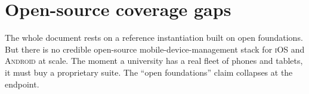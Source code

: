 \documentclass[11pt,a4paper,twoside]{book}
\newcommand{\institution}[1]{\textsc{#1}}
\begin{document}
\section{Open-source coverage gaps}
\label{sec:arg-oss-gaps}

\begin{questionbox}
The whole document rests on a reference instantiation built on open
foundations. But there is no credible open-source mobile-device-management
stack for \institution{iOS} and \institution{Android} at scale. The moment
a university has a real fleet of phones and tablets, it must buy a
proprietary suite. The ``open foundations'' claim collapses at the endpoint.
\end{questionbox}
\end{document}
